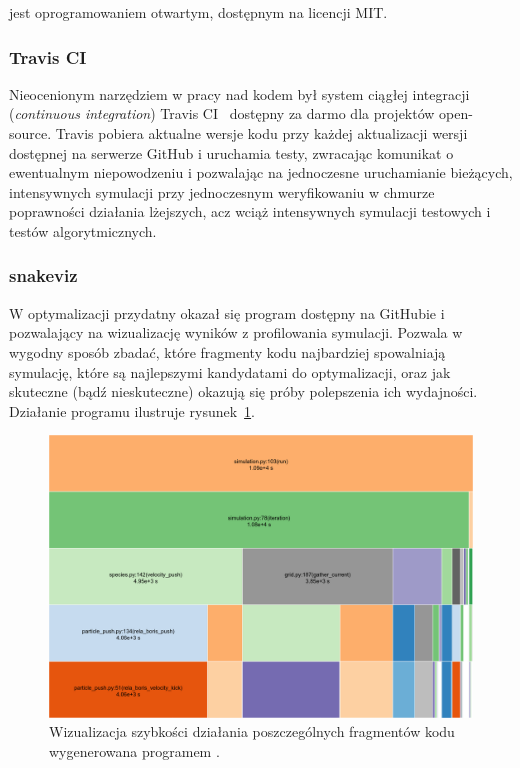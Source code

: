  jest oprogramowaniem otwartym, dostępnym na licencji MIT\@.

\subsubsection{Travis CI}
Nieocenionym narzędziem w pracy nad kodem był system ciągłej integracji
(\emph{continuous integration}) Travis CI~\cite{travisci}
dostępny za
darmo dla projektów open-source. Travis pobiera aktualne wersje kodu przy
każdej aktualizacji wersji dostępnej na serwerze GitHub i uruchamia testy,
zwracając komunikat o ewentualnym niepowodzeniu i pozwalając na jednoczesne
uruchamianie bieżących, intensywnych symulacji przy jednoczesnym
weryfikowaniu w chmurze poprawności działania lżejszych, acz wciąż intensywnych
symulacji testowych i testów algorytmicznych.

\subsubsection{snakeviz}

W optymalizacji przydatny okazał się program \cite{snakeviz} dostępny na
GitHubie i pozwalający na wizualizację wyników z profilowania
symulacji. Pozwala w wygodny sposób zbadać, które fragmenty kodu najbardziej
spowalniają symulację, które są najlepszymi kandydatami do optymalizacji, oraz
jak skuteczne (bądź nieskuteczne) okazują się próby polepszenia ich wydajności.
Działanie programu ilustruje rysunek~\ref{fig:snakeviz}.
\begin{figure}[h!]
  \includegraphics[width=\textwidth]{Images/snakeviz}
  \caption{Wizualizacja szybkości działania poszczególnych fragmentów kodu
    wygenerowana programem .\label{fig:snakeviz}}
\end{figure}
